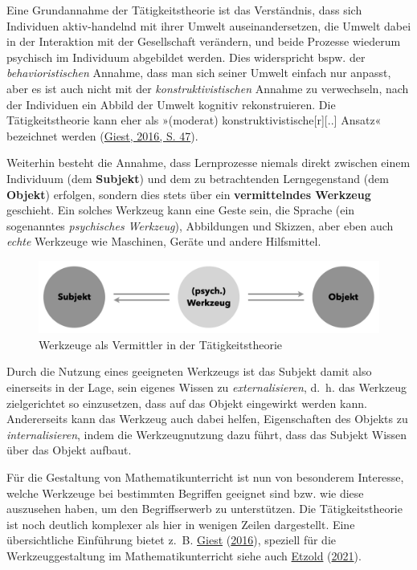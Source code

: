 \documentclass[
  ngerman,
]{scrbook}
\theoremstyle{definition}
\theoremstyle{definition}
\theoremstyle{definition}
\theoremstyle{definition}
\theoremstyle{remark}
\begin{document}
Eine Grundannahme der Tätigkeitstheorie ist das Verständnis, dass sich Individuen aktiv-handelnd mit ihrer Umwelt auseinandersetzen, die Umwelt dabei in der Interaktion mit der Gesellschaft verändern, und beide Prozesse wiederum psychisch im Individuum abgebildet werden. Dies widerspricht bspw. der \emph{behavioristischen} Annahme, dass man sich seiner Umwelt einfach nur anpasst, aber es ist auch nicht mit der \emph{konstruktivistischen} Annahme zu verwechseln, nach der Individuen ein Abbild der Umwelt kognitiv rekonstruieren. Die Tätigkeitstheorie kann eher als »(moderat) konstruktivistische{[}r{]}{[}..{]} Ansatz« bezeichnet werden (\protect\hyperlink{ref-Giest2016a}{Giest, 2016, S. 47}).

Weiterhin besteht die Annahme, dass Lernprozesse niemals direkt zwischen einem Individuum (dem \textbf{Subjekt}) und dem zu betrachtenden Lerngegenstand (dem \textbf{Objekt}) erfolgen, sondern dies stets über ein \textbf{vermittelndes Werkzeug} geschieht. Ein solches Werkzeug kann eine Geste sein, die Sprache (ein sogenanntes \emph{psychisches Werkzeug}), Abbildungen und Skizzen, aber eben auch \emph{echte} Werkzeuge wie Maschinen, Geräte und andere Hilfsmittel.

\begin{figure}

{\centering \includegraphics[width=0.75\linewidth]{pictures/7-SubjektObjekt} 

}

\caption{Werkzeuge als Vermittler in der Tätigkeitstheorie}\label{fig:SubjektObjekt}
\end{figure}

Durch die Nutzung eines geeigneten Werkzeugs ist das Subjekt damit also einerseits in der Lage, sein eigenes Wissen zu \emph{externalisieren}, d.~h. das Werkzeug zielgerichtet so einzusetzen, dass auf das Objekt eingewirkt werden kann. Andererseits kann das Werkzeug auch dabei helfen, Eigenschaften des Objekts zu \emph{internalisieren}, indem die Werkzeugnutzung dazu führt, dass das Subjekt Wissen über das Objekt aufbaut.

Für die Gestaltung von Mathematikunterricht ist nun von besonderem Interesse, welche Werkzeuge bei bestimmten Begriffen geeignet sind bzw. wie diese auszusehen haben, um den Begriffserwerb zu unterstützen. Die Tätigkeitstheorie ist noch deutlich komplexer als hier in wenigen Zeilen dargestellt. Eine übersichtliche Einführung bietet z.~B. \protect\hyperlink{ref-Giest2016a}{Giest} (\protect\hyperlink{ref-Giest2016a}{2016}), speziell für die Werkzeuggestaltung im Mathematikunterricht siehe auch \protect\hyperlink{ref-Etzold2021}{Etzold} (\protect\hyperlink{ref-Etzold2021}{2021}).
\end{document}
